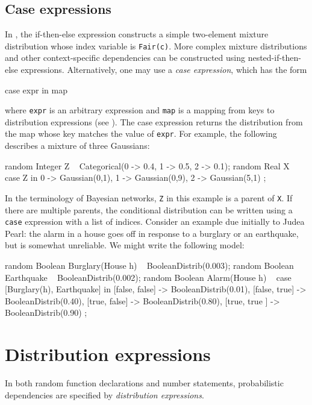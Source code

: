 \documentclass[12pt]{article}
\begin{document}
\subsection{Case expressions}\label{case-distribution-section}
In , the if-then-else expression constructs a simple two-element mixture distribution whose
index variable is {\tt Fair(c)}. More complex mixture distributions and other context-specific dependencies
can be constructed using nested-if-then-else expressions. Alternatively, one may
use a {\em case expression}, which has the form
\begin{blogcode}
case expr in map
\end{blogcode}
where {\tt expr} is an arbitrary expression and {\tt map} is a mapping from keys to distribution expressions (see ).
The case expression returns the distribution from the map whose key matches the value of {\tt expr}.
For example, the following describes a mixture of three Gaussians:
\begin{blogcode}
random Integer Z ~ Categorical({0 -> 0.4, 1 -> 0.5, 2 -> 0.1});
random Real X ~ 
  case Z in {
    0 -> Gaussian(0,1), 
    1 -> Gaussian(0,9), 
    2 -> Gaussian(5,1)
  };
\end{blogcode}

In the terminology of Bayesian networks, {\tt Z} in this example is a parent of {\tt X}.
If there are multiple parents, the conditional distribution can be written using
a {\tt case} expression with a list of indices. 
Consider an example due initially to Judea Pearl:
the alarm in a house goes off in response to a burglary or an earthquake,
but is somewhat unreliable. We might write the following model:
\begin{blogcode}
random Boolean Burglary(House h) ~ BooleanDistrib(0.003);
random Boolean Earthquake ~ BooleanDistrib(0.002);
random Boolean Alarm(House h) ~ 
  case [Burglary(h), Earthquake] in {
    [false, false] -> BooleanDistrib(0.01),
    [false, true]  -> BooleanDistrib(0.40),
    [true, false]  -> BooleanDistrib(0.80),
    [true, true ]  -> BooleanDistrib(0.90)
  };
\end{blogcode}


\section{Distribution expressions}\label{distribution-section}
In both random function declarations and number statements, probabilistic dependencies are specified by
{\em distribution expressions}. 
\end{document}
